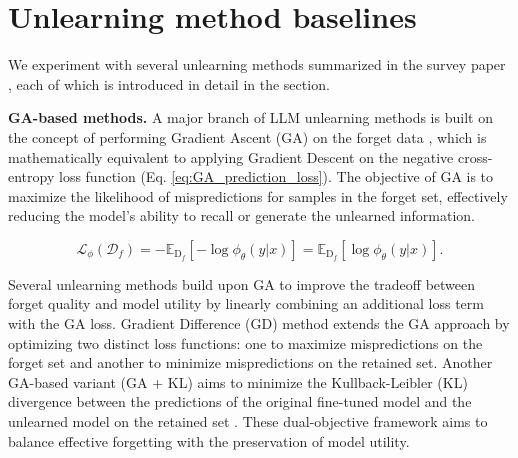 \section{Unlearning method baselines}\label{app:unlearning_methods_baselines}

We experiment with several unlearning methods summarized in the survey paper \cite{liu2024rethinking, tofu}, each of which is introduced in detail in the section. 

\textbf{GA-based methods.} 
A major branch of LLM unlearning methods is built on the concept of performing Gradient Ascent (GA) on the forget data \cite{jang2022knowledge, yao2023large}, which is mathematically equivalent to applying Gradient Descent on the negative cross-entropy loss function (Eq. \ref{eq:GA_prediction_loss}). The objective of GA is to maximize the likelihood of mispredictions for samples in the forget set, effectively reducing the model's ability to recall or generate the unlearned information.

\vspace{-5mm}
\begin{equation}
    \mathcal{L}_{\phi} (\mathcal{D}_f)= - \mathbb{E}_{\text{D}_f}\left[{-\log \phi_\theta(y|x)} \right] 
    = \mathbb{E}_{\text{D}_f}\left[ \log \phi_\theta(y|x) \right].
    \label{eq:GA_prediction_loss}
\end{equation}

Several unlearning methods build upon GA to improve the tradeoff between forget quality and model utility by linearly combining an additional loss term with the GA loss. Gradient Difference (GD) method \cite{liu2022continual} extends the GA approach by optimizing two distinct loss functions: one to maximize mispredictions on the forget set and another to minimize mispredictions on the retained set. Another GA-based variant (GA + KL) aims to minimize the Kullback-Leibler (KL) divergence between the predictions of the original fine-tuned model and the unlearned model on the retained set \cite{tofu}. These dual-objective framework aims to balance effective forgetting with the preservation of model utility.



